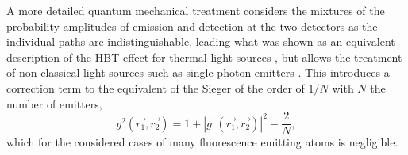 A more detailed quantum mechanical treatment considers the mixtures of the probability amplitudes of emission and detection at the two detectors as the individual paths are indistinguishable, leading what was shown as an equivalent description of the HBT effect for thermal light sources \cite{fano1961,sudarshan1963,glauber2006}, but allows the treatment of non classical light sources such as single photon emitters \cite{mandel1995,classen2017}. This introduces a correction term to the equivalent of the Sieger of the order of $1/N$ with $N$ the number of emitters,
\begin{equation}
	g^2(\vec{r_1},\vec{r_2}) = 1+ |g^1(\vec{r_1},\vec{r_2}) |^2 - \frac{2}{N} ,
\end{equation}
which for the considered cases of many fluorescence emitting atoms is negligible.


